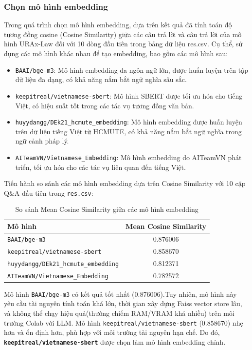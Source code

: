 \subsubsection{Chọn mô hình embedding}
Trong quá trình chọn mô hình embedding, dựa trên kết quả đã tính toán độ tương đồng cosine
(Cosine Similarity) giữa các câu trả lời và câu trả lời của mô hình URAx-Law đối với 10 dòng
đầu tiên trong bảng dữ liệu res.csv. Cụ thể, sử dụng các mô hình khác nhau để tạo embedding,
bao gồm các mô hình sau:
\begin{itemize}
  \item \texttt{BAAI/bge-m3}\cite{bge_m3}: Mô hình embedding đa ngôn ngữ lớn, được huấn luyện trên tập dữ liệu đa dạng, có khả năng nắm bắt ngữ nghĩa sâu sắc.
  \item \texttt{keepitreal/vietnamese-sbert}\cite{reimers2019sbert}: Mô hình SBERT được tối ưu hóa cho tiếng Việt, có hiệu suất tốt trong các tác vụ tương đồng văn bản.
  \item \texttt{huyydangg/DEk21\_hcmute\_embedding}: Mô hình embedding được huấn luyện trên dữ liệu tiếng Việt từ HCMUTE, có khả năng nắm bắt ngữ nghĩa trong ngữ cảnh pháp lý.
  \item \texttt{AITeamVN/Vietnamese\_Embedding}: Mô hình embedding do AITeamVN phát triển, tối ưu hóa cho các tác vụ liên quan đến tiếng Việt.
\end{itemize}
Tiến hành so sánh các mô hình embedding dựa trên Cosine Similarity với 10 cặp Q\&A đầu tiên trong \texttt{res.csv}:

\begin{table}[H]
\centering
\caption{So sánh Mean Cosine Similarity giữa các mô hình embedding}
\begin{tabular}{lc}
  \toprule
  \textbf{Mô hình} & \textbf{Mean Cosine Similarity} \\
  \midrule
  \texttt{BAAI/bge-m3}\cite{bge_m3}                        & 0.876006 \\
  \texttt{keepitreal/vietnamese-sbert}\cite{reimers2019sbert}         & 0.858670 \\
  \texttt{huyydangg/DEk21\_hcmute\_embedding}  & 0.812371 \\
  \texttt{AITeamVN/Vietnamese\_Embedding}      & 0.782572 \\
  \bottomrule
\end{tabular}
\end{table}

Mô hình \texttt{BAAI/bge-m3} có kết quả tốt nhất (0.876006).Tuy nhiên, mô hình này yêu cầu tài nguyên
tính toán khá lớn, thời gian xây dựng Faiss vector store lâu, và không thể chạy hiệu quả(thường
chiếm RAM/VRAM khá nhiều) trên môi trường Colab với LLM. Mô hình \texttt{keepitreal/vietnamese-sbert} (0.858670) nhẹ hơn và ổn định hơn, phù hợp với môi trường tài nguyên hạn chế. Do đó, \textbf{\texttt{keepitreal/vietnamese-sbert}} được chọn làm mô hình embedding chính.

